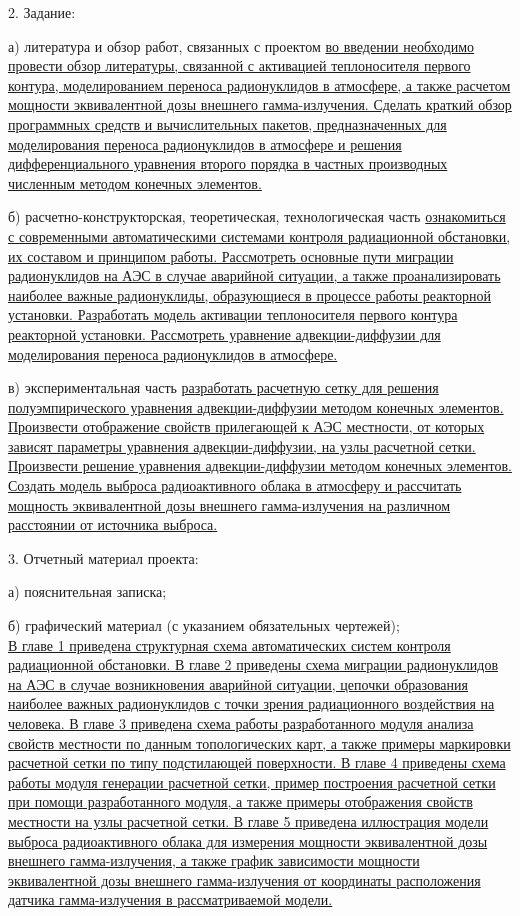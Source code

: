 2. Задание:

\hspace{1cm} а) литература и обзор работ, связанных с проектом \ul{во введении необходимо провести обзор литературы, связанной с 
активацией теплоносителя первого контура, моделированием переноса радионуклидов в атмосфере, а также расчетом мощности 
эквивалентной дозы внешнего гамма-излучения. Сделать краткий обзор программных средств и вычислительных пакетов, предназначенных 
для моделирования переноса радионуклидов в атмосфере и решения дифференциального уравнения второго порядка в частных производных 
численным методом конечных элементов.}

\hspace{1cm} б) расчетно-конструкторская, теоретическая, технологическая часть \ul{ознакомиться с современными 
автоматическими системами контроля радиационной обстановки, их составом и принципом работы. Рассмотреть основные пути 
миграции радионуклидов на АЭС в случае аварийной ситуации, а также проанализировать наиболее важные радионуклиды,
образующиеся в процессе работы реакторной установки. Разработать модель активации теплоносителя первого контура 
реакторной установки. Рассмотреть уравнение адвекции-диффузии для моделирования переноса радионуклидов в атмосфере.}

\hspace{1cm} в) экспериментальная часть \ul{разработать расчетную сетку для решения полуэмпирического уравнения 
адвекции-диффузии методом конечных элементов. Произвести отображение свойств прилегающей к АЭС местности, от которых 
зависят параметры уравнения адвекции-диффузии, на узлы расчетной сетки. Произвести решение уравнения адвекции-диффузии 
методом конечных элементов. Создать модель выброса радиоактивного облака в атмосферу и рассчитать мощность эквивалентной 
дозы внешнего гамма-излучения на различном расстоянии от источника выброса.}

3. Отчетный материал проекта:

\hspace{1cm} а) пояснительная записка;

\hspace{1cm} б) графический материал (с указанием обязательных чертежей); \\
\ul{В главе 1 приведена структурная схема автоматических систем контроля радиационной обстановки. В главе 2 приведены 
схема миграции радионуклидов на АЭС в случае возникновения аварийной ситуации, цепочки образования наиболее важных 
радионуклидов с точки зрения радиационного воздействия на человека. В главе 3 приведена схема работы разработанного 
модуля анализа свойств местности по данным топологических карт, а также примеры маркировки расчетной сетки по типу 
подстилающей поверхности. В главе 4 приведены схема работы модуля генерации расчетной сетки, пример построения расчетной 
сетки при помощи разработанного модуля, а также примеры отображения свойств местности на узлы расчетной сетки. В главе 
5 приведена иллюстрация модели выброса радиоактивного облака для измерения мощности эквивалентной дозы внешнего гамма-излучения, 
а также график зависимости мощности эквивалентной дозы внешнего гамма-излучения от координаты расположения датчика 
гамма-излучения в рассматриваемой модели.}

